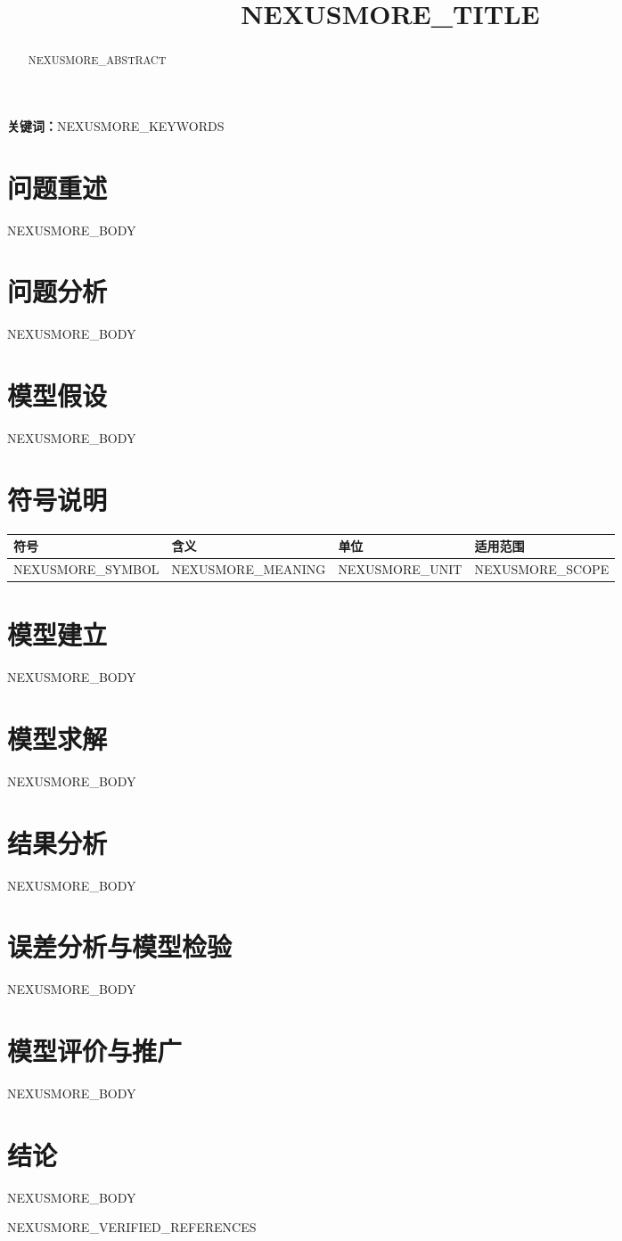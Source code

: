 \documentclass[UTF8,fontset=none,12pt,a4paper]{ctexart}
\title{NEXUSMORE_TITLE}
\author{}
\date{}
\begin{document}
\maketitle
\begin{abstract}
NEXUSMORE_ABSTRACT
\end{abstract}
\noindent\textbf{关键词：}NEXUSMORE_KEYWORDS
\clearpage
\section{问题重述}
NEXUSMORE_BODY
\section{问题分析}
NEXUSMORE_BODY
\section{模型假设}
NEXUSMORE_BODY
\section{符号说明}
\begin{longtable}{llll}
\toprule 符号 & 含义 & 单位 & 适用范围 \\ \midrule
NEXUSMORE_SYMBOL & NEXUSMORE_MEANING & NEXUSMORE_UNIT & NEXUSMORE_SCOPE \\
\bottomrule
\end{longtable}
\section{模型建立}
NEXUSMORE_BODY
\section{模型求解}
NEXUSMORE_BODY
\section{结果分析}
NEXUSMORE_BODY
\section{误差分析与模型检验}
NEXUSMORE_BODY
\section{模型评价与推广}
NEXUSMORE_BODY
\section{结论}
NEXUSMORE_BODY
\begin{thebibliography}{99}
NEXUSMORE_VERIFIED_REFERENCES
\end{thebibliography}
\end{document}
